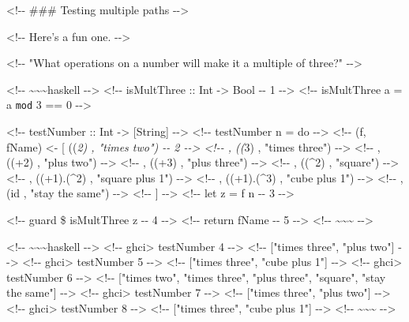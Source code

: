 \documentclass[]{article}
\begin{document}
\textless{}!-\/- \#\#\# Testing multiple paths -\/-\textgreater{}

\textless{}!-\/- Here's a fun one. -\/-\textgreater{}

\textless{}!-\/- "What operations on a number will make it a multiple of three?"
-\/-\textgreater{}

\textless{}!-\/- \textasciitilde{}\textasciitilde{}\textasciitilde{}haskell
-\/-\textgreater{} \textless{}!-\/- isMultThree :: Int -\textgreater{} Bool -\/-
1 -\/-\textgreater{} \textless{}!-\/- isMultThree a = a \texttt{mod} 3 == 0
-\/-\textgreater{}

\textless{}!-\/- testNumber :: Int -\textgreater{} {[}String{]}
-\/-\textgreater{} \textless{}!-\/- testNumber n = do -\/-\textgreater{}
\textless{}!-\/- (f, fName) \textless{}- {[} ((\emph{2) , "times two") -\/- 2
-\/-\textgreater{} \textless{}!-\/- , ((}3) , "times three") -\/-\textgreater{}
\textless{}!-\/- , ((+2) , "plus two") -\/-\textgreater{} \textless{}!-\/- ,
((+3) , "plus three") -\/-\textgreater{} \textless{}!-\/- , ((\^{}2) , "square")
-\/-\textgreater{} \textless{}!-\/- , ((+1).(\^{}2) , "square plus 1")
-\/-\textgreater{} \textless{}!-\/- , ((+1).(\^{}3) , "cube plus 1")
-\/-\textgreater{} \textless{}!-\/- , (id , "stay the same") -\/-\textgreater{}
\textless{}!-\/- {]} -\/-\textgreater{} \textless{}!-\/- let z = f n -\/- 3
-\/-\textgreater{}

\textless{}!-\/- guard \$ isMultThree z -\/- 4 -\/-\textgreater{}
\textless{}!-\/- return fName -\/- 5 -\/-\textgreater{} \textless{}!-\/-
\textasciitilde{}\textasciitilde{}\textasciitilde{} -\/-\textgreater{}

\textless{}!-\/- \textasciitilde{}\textasciitilde{}\textasciitilde{}haskell
-\/-\textgreater{} \textless{}!-\/- ghci\textgreater{} testNumber 4
-\/-\textgreater{} \textless{}!-\/- {[}"times three", "plus two"{]}
-\/-\textgreater{} \textless{}!-\/- ghci\textgreater{} testNumber 5
-\/-\textgreater{} \textless{}!-\/- {[}"times three", "cube plus 1"{]}
-\/-\textgreater{} \textless{}!-\/- ghci\textgreater{} testNumber 6
-\/-\textgreater{} \textless{}!-\/- {[}"times two", "times three", "plus three",
"square", "stay the same"{]} -\/-\textgreater{} \textless{}!-\/-
ghci\textgreater{} testNumber 7 -\/-\textgreater{} \textless{}!-\/- {[}"times
three", "plus two"{]} -\/-\textgreater{} \textless{}!-\/- ghci\textgreater{}
testNumber 8 -\/-\textgreater{} \textless{}!-\/- {[}"times three", "cube plus
1"{]} -\/-\textgreater{} \textless{}!-\/-
\textasciitilde{}\textasciitilde{}\textasciitilde{} -\/-\textgreater{}
\end{document}
